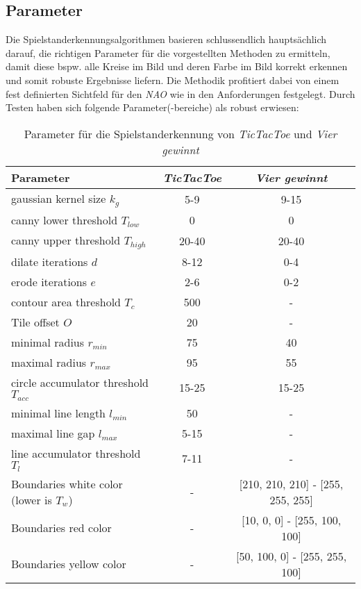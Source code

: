 \subsection{Parameter}
Die Spielstanderkennungsalgorithmen basieren schlussendlich hauptsächlich darauf, die richtigen Parameter für die vorgestellten Methoden zu ermitteln, damit diese bspw. alle Kreise im Bild und deren Farbe im Bild korrekt erkennen und somit robuste Ergebnisse liefern. Die Methodik profitiert dabei von einem fest definierten Sichtfeld für den \textit{NAO} wie in den Anforderungen festgelegt.
Durch Testen haben sich folgende Parameter(-bereiche) als robust erwiesen:

\begin{table}[!htbp]
\centering
\begin{tabular}{|l|c|c|}
  \hline
  Parameter & \textit{TicTacToe} & \textit{Vier gewinnt} \\
\hline
 gaussian kernel size $k_g$ & 5-9 & 9-15  \\
\hline
 canny lower threshold $T_{low}$ & 0 & 0 \\
 \hline
 canny upper threshold $T_{high}$ & 20-40 & 20-40  \\
\hline
 dilate iterations $d$ & 8-12 & 0-4 \\
 \hline
 erode iterations $e$ & 2-6 & 0-2 \\
 \hline
 contour area threshold $T_c$ & 500 & - \\
 \hline
 Tile offset $O$ & 20 & - \\
  \hline
 minimal radius $r_{min}$ & 75 & 40 \\
  \hline
 maximal radius $r_{max}$ & 95 & 55 \\
  \hline
 circle accumulator threshold $T_{acc}$ & 15-25 & 15-25 \\
   \hline
minimal line length $l_{min}$ & 50 & - \\
  \hline
maximal line gap $l_{max}$ & 5-15 & - \\
  \hline
line accumulator threshold $T_{l}$ & 7-11 & - \\
   \hline
 Boundaries white color (lower is $T_w$) & - & [210, 210, 210] - [255, 255, 255] \\
  \hline
 Boundaries red color & - & [10, 0, 0] - [255, 100, 100] \\
   \hline
 Boundaries yellow color & - & [50, 100, 0] - [255, 255, 100] \\
  \hline
\end{tabular}
\caption{Parameter für die Spielstanderkennung von \textit{TicTacToe} und \textit{Vier gewinnt}}
\label{tab:vision_parameters}
\end{table}    
